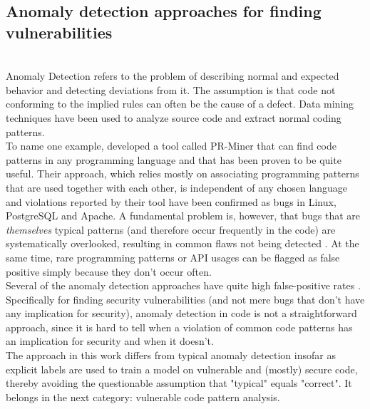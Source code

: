 \documentclass[
	a4paper,
	pagesize,
	pdftex,
	12pt,
	twoside, %
	BCOR=5mm, %
	ngerman,
	fleqn,
	final,
	]{scrartcl}
\begin{document}
\subsection{Anomaly detection approaches for finding vulnerabilities}\mbox{}\\
Anomaly Detection refers to the problem of describing normal and expected behavior and detecting deviations from it. The assumption is that code not conforming to the implied rules can often be the cause of a defect. Data mining techniques have been used to analyze source code and extract normal coding patterns.\\
To name one example, \cite{Li.2005} developed a tool called PR-Miner that can find code patterns in any programming language and that has been proven to be quite useful. Their approach, which relies mostly on associating programming patterns that are used together with each other, is independent of any chosen language and violations reported by their tool have been confirmed as bugs in Linux, PostgreSQL and Apache. A fundamental problem is, however, that bugs that are \textit{themselves} typical patterns (and therefore occur frequently in the code) are systematically overlooked, resulting in common flaws not being detected \cite{Yamaguchi.2012}. At the same time, rare programming patterns or API usages can be flagged as false positive simply because they don't occur often.\\
Several of the anomaly detection approaches have quite high false-positive rates \citep{Ghaffarian.2017}. Specifically for finding security vulnerabilities (and not mere bugs that don't have any implication for security), anomaly detection in code is not a straightforward approach, since it is hard to tell when a violation of common code patterns has an implication for security and when it doesn't.\\
The approach in this work differs from typical anomaly detection insofar as explicit labels are used to train a model on vulnerable and (mostly) secure code, thereby avoiding the questionable assumption that "typical" equals "correct". It belongs in the next category: vulnerable code pattern analysis. 
\end{document}
